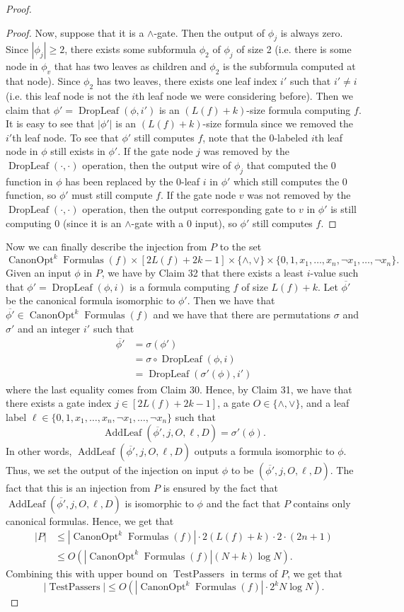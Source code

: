 \documentclass[10pt,a4paper]{article}
\newcommand{\Canon}[1]{\operatorname{CanonOpt}^{#1}\!\operatorname{Formulas}}
\newcommand{\DropLeaf}{\operatorname{DropLeaf}}
\newcommand{\AddLeaf}{\operatorname{AddLeaf}}
\begin{document}
\begin{proof}
\begin{proof}
Now, suppose that it is a $\land$-gate. Then the output of $\phi_j$ is always zero. Since $|\phi_j|\geq 2$, there exists some subformula $\phi_2$ of $\phi_j$ of size 2 (i.e. there is some node in $\phi_v$ that has two leaves as children and $\phi_2$ is the subformula computed at that node). Since $\phi_2$ has two leaves, there exists one leaf index $i'$ such that $i'\ne i$ (i.e. this leaf node is not the $i$th leaf node we were considering before).
Then we claim that $\phi'=\DropLeaf(\phi,i')$ is an $(L(f)+k)$-size formula computing $f$. It is easy to see that $|\phi'|$ is an $(L(f)+k)$-size formula since we removed the $i'$th leaf node. To see that $\phi'$ still computes $f$, note that the 0-labeled $i$th leaf node in $\phi$ still exists in $\phi'$. If the gate node $j$ was removed by the $\DropLeaf(\cdot,\cdot)$ operation, then the output wire of $\phi_j$ that computed the 0 function in $\phi$ has been replaced by the 0-leaf $i$ in $\phi'$ which still computes the 0 function, so $\phi'$ must still compute $f$. If the gate node $v$ was not removed by the $\DropLeaf(\cdot,\cdot)$ operation, then the output corresponding gate to $v$ in $\phi'$ is still computing 0 (since it is an $\land$-gate with a 0 input), so $\phi'$ still computes $f$.
\end{proof}
Now we can finally describe the injection from $P$ to the set
\[\Canon{k}(f)\times[2L(f)+2k-1]\times\{\land,\lor\}\times\{0,1,x_1,\ldots,x_n,\neg x_1,\ldots,\neg x_n\}.\]
Given an input $\phi$ in $P$, we have by Claim 32 that there exists a least $i$-value such that $\phi'=\DropLeaf(\phi,i)$ is a formula computing $f$ of size $L(f)+k$. Let $\overline{\phi'}$ be the canonical formula isomorphic to $\phi'$. Then we have that $\overline{\phi'}\in\Canon{k}(f)$ and we have that there are permutations $\sigma$ and $\sigma'$ and an integer $i'$ such that
\begin{align*}\overline{\phi'}&=\sigma(\phi')\\&=\sigma\circ\DropLeaf(\phi,i)\\&=\DropLeaf(\sigma'(\phi),i')\end{align*}
where the last equality comes from Claim 30.
Hence, by Claim 31, we have that there exists a gate index $j\in[2L(f)+2k-1]$, a gate $O\in\{\land,\lor\}$, and a leaf label $\ell\in\{0,1,x_1,\ldots,x_n,\neg x_1,\ldots,\neg x_n\}$ such that
\[\AddLeaf(\overline{\phi'},j,O,\ell,D)=\sigma'(\phi).\]
In other words, $\AddLeaf(\overline{\phi'},j,O,\ell,D)$ outputs a formula isomorphic to $\phi$.
Thus, we set the output of the injection on input $\phi$ to be $(\overline{\phi'},j,O,\ell,D)$. The fact that this is an injection from $P$ is ensured by the fact that $\AddLeaf(\overline{\phi'},j,O,\ell,D)$ is isomorphic to $\phi$ and the fact that $P$ contains only canonical formulas.
Hence, we get that
\begin{align*}|P|&\leq|\Canon{k}(f)|\cdot 2(L(f)+k)\cdot 2\cdot(2n+1)\\&\leq O(|\Canon{k}(f)|(N+k)\log N).\end{align*}
Combining this with upper bound on $\operatorname{TestPassers}$ in terms of $P$, we get that
\[|\operatorname{TestPassers}|\leq O(|\Canon{k}(f)|\cdot 2^kN\log N).\]
\end{proof}
\end{document}
